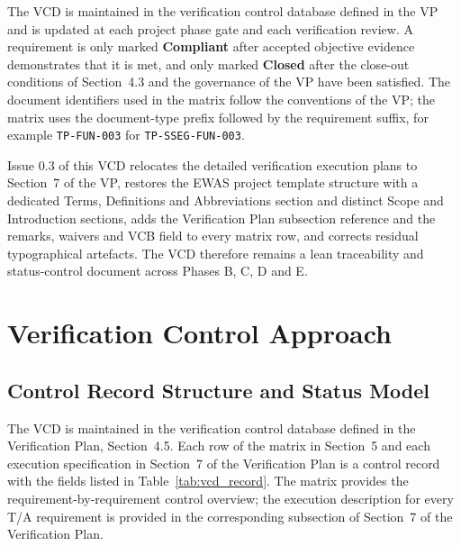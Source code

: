 The VCD is maintained in the verification control database defined in the VP and is updated at each project phase gate and each verification review. A requirement is only marked \textbf{Compliant} after accepted objective evidence demonstrates that it is met, and only marked \textbf{Closed} after the close-out conditions of Section~4.3 and the governance of the VP have been satisfied. The document identifiers used in the matrix follow the conventions of the VP; the matrix uses the document-type prefix followed by the requirement suffix, for example \texttt{TP-FUN-003} for \texttt{TP-SSEG-FUN-003}.

Issue 0.3 of this VCD relocates the detailed verification execution plans to Section~7 of the VP, restores the EWAS project template structure with a dedicated Terms, Definitions and Abbreviations section and distinct Scope and Introduction sections, adds the Verification Plan subsection reference and the remarks, waivers and VCB field to every matrix row, and corrects residual typographical artefacts. The VCD therefore remains a lean traceability and status-control document across Phases B, C, D and E.

\section{Verification Control Approach}

\subsection{Control Record Structure and Status Model}

The VCD is maintained in the verification control database defined in the Verification Plan, Section~4.5. Each row of the matrix in Section~5 and each execution specification in Section~7 of the Verification Plan is a control record with the fields listed in Table~\ref{tab:vcd_record}. The matrix provides the requirement-by-requirement control overview; the execution description for every T/A requirement is provided in the corresponding subsection of Section~7 of the Verification Plan.


